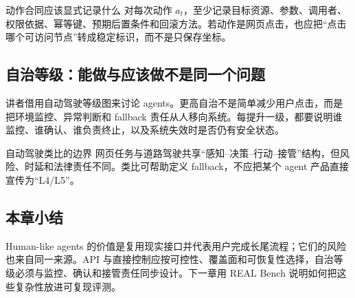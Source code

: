 
\begin{importantbox}{动作合同应该显式记录什么}
对每次动作 $a_t$，至少记录目标资源、参数、调用者、权限依据、幂等键、预期后置条件和回滚方法。若动作是网页点击，也应把“点击哪个可访问节点”转成稳定标识，而不是只保存坐标。
\end{importantbox}

\subsection{自治等级：能做与应该做不是同一个问题}

讲者借用自动驾驶等级图来讨论 agents。更高自治不是简单减少用户点击，而是把环境监控、异常判断和 fallback 责任从人移向系统。每提升一级，都要说明谁监控、谁确认、谁负责终止，以及系统失效时是否仍有安全状态。


\begin{warningbox}{自动驾驶类比的边界}
网页任务与道路驾驶共享“感知--决策--行动--接管”结构，但风险、时延和法律责任不同。类比可帮助定义 fallback，不应把某个 agent 产品直接宣传为“L4/L5”。
\end{warningbox}

\subsection{本章小结}

Human-like agents 的价值是复用现实接口并代表用户完成长尾流程；它们的风险也来自同一来源。API 与直接控制应按可控性、覆盖面和可恢复性选择，自治等级必须与监控、确认和接管责任同步设计。下一章用 REAL Bench 说明如何把这些复杂性放进可复现评测。

